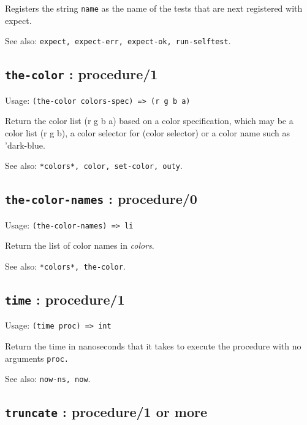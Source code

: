 \documentclass[
]{article}
\newcommand{\passthrough}[1]{#1}
\begin{document}
Registers the string \passthrough{\lstinline!name!} as the name of the
tests that are next registered with expect.

See also:
\passthrough{\lstinline!expect, expect-err, expect-ok, run-selftest!}.

\hypertarget{the-color-procedure1-1}{%
\subsection{\texorpdfstring{\texttt{the-color} :
procedure/1}{the-color : procedure/1}}\label{the-color-procedure1-1}}

Usage: \passthrough{\lstinline!(the-color colors-spec) => (r g b a)!}

Return the color list (r g b a) based on a color specification, which
may be a color list (r g b), a color selector for (color selector) or a
color name such as 'dark-blue.

See also: \passthrough{\lstinline!*colors*, color, set-color, outy!}.

\hypertarget{the-color-names-procedure0-1}{%
\subsection{\texorpdfstring{\texttt{the-color-names} :
procedure/0}{the-color-names : procedure/0}}\label{the-color-names-procedure0-1}}

Usage: \passthrough{\lstinline!(the-color-names) => li!}

Return the list of color names in \emph{colors}.

See also: \passthrough{\lstinline!*colors*, the-color!}.

\hypertarget{time-procedure1-1}{%
\subsection{\texorpdfstring{\texttt{time} :
procedure/1}{time : procedure/1}}\label{time-procedure1-1}}

Usage: \passthrough{\lstinline!(time proc) => int!}

Return the time in nanoseconds that it takes to execute the procedure
with no arguments \passthrough{\lstinline!proc.!}

See also: \passthrough{\lstinline!now-ns, now!}.

\hypertarget{truncate-procedure1-or-more-1}{%
\subsection{\texorpdfstring{\texttt{truncate} : procedure/1 or
more}{truncate : procedure/1 or more}}\label{truncate-procedure1-or-more-1}}
\end{document}
